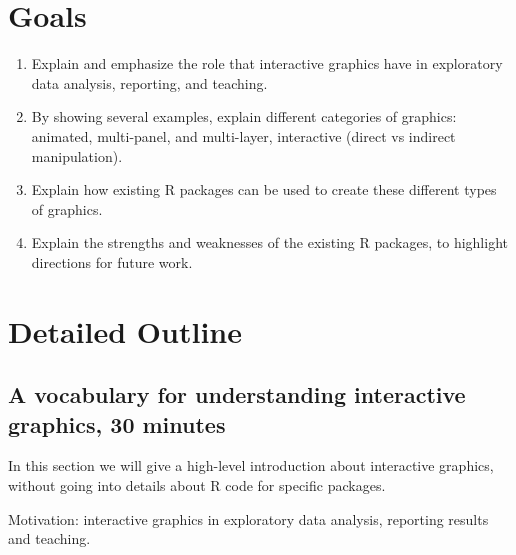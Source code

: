 \documentclass[11pt]{article}
\begin{document}
\section{Goals}
\label{sec:orgheadline6}

\begin{enumerate}
\item Explain and emphasize the role that interactive graphics have in
  exploratory data analysis, reporting, and teaching.
\item By showing several examples, explain different categories of
  graphics: animated, multi-panel, and multi-layer, interactive
  (direct vs indirect manipulation).
\item Explain how existing R packages can be used to create these
  different types of graphics.
\item Explain the strengths and weaknesses of the existing R packages, to
  highlight directions for future work.
\end{enumerate}

\section{Detailed Outline}
\label{sec:orgheadline10}

\subsection{A vocabulary for understanding interactive graphics, 30 minutes}
\label{sec:orgheadline7}

In this section we will give a high-level introduction about
interactive graphics, without going into details about R code for
specific packages.

Motivation: interactive graphics in exploratory data analysis,
reporting results and teaching.
\end{document}
